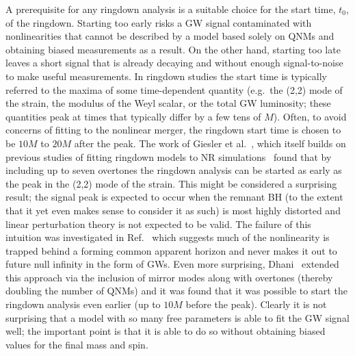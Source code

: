 A prerequisite for any ringdown analysis is a suitable choice for the start time, $t_0$, of the ringdown. 
Starting too early risks a GW signal contaminated with nonlinearities that cannot be described by a model based solely on QNMs and obtaining biased measurements as a result. 
On the other hand, starting too late leaves a short signal that is already decaying and without enough signal-to-noise to make useful measurements. 
In ringdown studies the start time is typically referred to the maxima of some time-dependent quantity (e.g.\ the (2,2) mode of the strain, the modulus of the Weyl scalar, or the total GW luminosity; these quantities peak at times that typically differ by a few tens of $M$). 
Often, to avoid concerns of fitting to the nonlinear merger, the ringdown start time is chosen to be $10M$ to $20M$ after the peak. 
The work of Giesler et al.~\cite{Giesler:2019uxc}, which itself builds on previous studies of fitting ringdown models to NR simulations~\cite{Dorband:2006gg, Buonanno:2006ui, Berti:2007fi, Kamaretsos:2011um, Kamaretsos:2012bs, London:2014cma, Baibhav:2017jhs} found that by including up to seven overtones the ringdown analysis can be started as early as the peak in the (2,2) mode of the strain. 
This might be considered a surprising result; the signal peak is expected to occur when the remnant BH (to the extent that it yet even makes sense to consider it as such) is most highly distorted and linear perturbation theory is not expected to be valid. 
The failure of this intuition was investigated in Ref.~\cite{Okounkova:2020vwu} which suggests much of the nonlinearity is trapped behind a forming common apparent horizon and never makes it out to future null infinity in the form of GWs. 
Even more surprising, Dhani~\cite{Dhani:2020nik} extended this approach via the inclusion of mirror modes along with overtones (thereby doubling the number of QNMs) and it was found that it was possible to start the ringdown analysis even earlier (up to $10M$ before the peak). 
Clearly it is not surprising that a model with so many free parameters is able to fit the GW signal well; the important point is that it is able to do so without obtaining biased values for the final mass and spin. 

